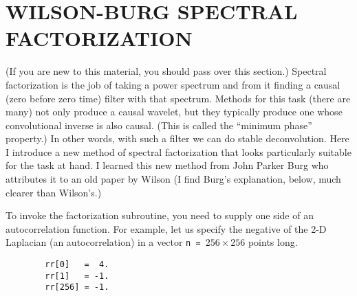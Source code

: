 \section{WILSON-BURG SPECTRAL FACTORIZATION}
(If you are new to this material, you should pass over this section.)
Spectral factorization is the job of taking a power spectrum
and from it finding a causal (zero before zero time) filter with that spectrum.
Methods for this task (there are many)
not only produce a causal wavelet,
but they typically produce one whose
convolutional inverse is also causal.
(This is called the ``minimum phase'' property.)
In other words, with such a filter we can do stable deconvolution.
Here
I introduce a new method of spectral factorization
that looks particularly suitable for the task at hand.
I learned this new method from John Parker Burg who
attributes it to an old paper by Wilson
(I find Burg's explanation, below, much clearer than Wilson's.)
\par
\begin{comment}
Below find subroutine \texttt{lapfac()} which
was used in the previous section
to factor the Laplacian operator.
\end{comment}
To invoke the factorization subroutine,
you need to supply one side of an autocorrelation function.
For example, let us specify the negative of the 2-D Laplacian
(an autocorrelation)
in a vector {\tt n = }$256\times 256$ points long.
\par\noindent
\footnotesize
\begin{verbatim}
        rr[0]   =  4.
        rr[1]   = -1.
        rr[256] = -1.
\end{verbatim}
\normalsize
\begin{comment}
\par
Subroutine \texttt{lapfac()}
finds the helical derivative (factored negative Laplacian)
and then prepares the required filter
coefficient tables for the helix convolution
and deconvolution subroutines.
\moddex{lapfac}{factor 2-D Laplacian}
Subroutine \texttt{lapfacn()} has its main job
done by subroutine \texttt{wilson\_factor()} \vpageref{lst:wilson}
shown after the Wilson-Burg theory.
\end{comment}
%
